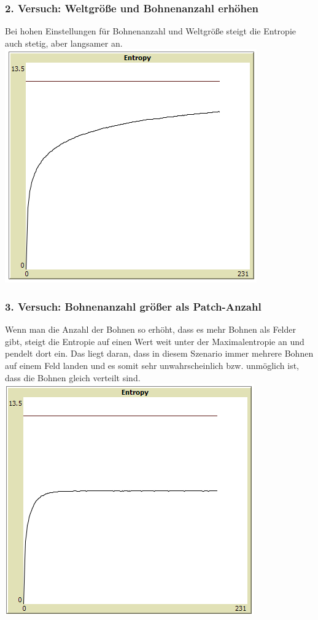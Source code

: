 \documentclass[10pt]{article}%
\theoremstyle{nonumberplain}
\begin{document}
\subsubsection{2. Versuch: Weltgröße und Bohnenanzahl erhöhen}
Bei hohen Einstellungen für Bohnenanzahl und Weltgröße steigt die Entropie auch stetig, aber langsamer an. \\
\includegraphics [scale = 0.85]{2-hoch.png}
\subsubsection{3. Versuch: Bohnenanzahl größer als Patch-Anzahl}
Wenn man die Anzahl der Bohnen so erhöht, dass es mehr Bohnen als Felder gibt,
steigt die Entropie auf einen Wert weit unter der Maximalentropie an und pendelt dort ein. Das liegt daran, dass in diesem Szenario immer mehrere Bohnen auf einem Feld landen und es somit sehr unwahrscheinlich bzw. unmöglich ist, dass die Bohnen gleich verteilt sind. \\
\includegraphics [scale = 0.85]{2-vieleBohnen.png}
\end{document}
